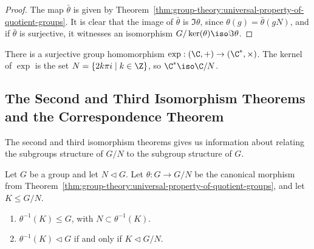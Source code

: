 \documentclass[12pt]{report}
\begin{document}
\begin{proof}
  The map \(\bar \theta\) is given by Theorem~\ref{thm:group-theory:universal-property-of-quotient-groups}.
  It is clear that the image of \(\bar\theta\) is \(\Im \theta\), since \(\theta(g) = \bar \theta(gN)\), and if \(\bar\theta\) is surjective, it witnesses an isomorphism \(G/\ker(\theta) \iso \Im \theta\).
\end{proof}

\begin{example}
  There is a surjective group homomorphism \(\exp : (\C, +) \to (\C^{*}, \times)\).
  The kernel of \(\exp\) is the set \(N = \{2k\pi i \mid k \in \Z\}\), so \(\C^{*} \iso \C/N\).
\end{example}


\subsection{The Second and Third Isomorphism Theorems and the Correspondence Theorem}\label{sec:second-and-third-isomorphism-theorems-and-correspondence-theorem}

The second and third isomorphism theorems gives us information about relating the subgroups structure of \(G /N\) to the subgroup structure of \(G\).

\begin{proposition}\label{prp:group-theory:preimage-of-subgroups-of-G/N}
  Let \(G\) be a group and let \(N \triangleleft G\).
  Let \(\theta: G \to G/N\) be the canonical morphism from Theorem~\ref{thm:group-theory:universal-property-of-quotient-groups}, and let \(K \leq G / N\).

  \begin{enumerate}
  \item
    \(\theta^{-1}(K) \leq G\), with \(N \subset \theta^{-1}(K)\).
  \item
    \(\theta^{-1}(K) \triangleleft G\) if and only if \(K \triangleleft G/N\).
  \end{enumerate}
\end{proposition}
\end{document}
